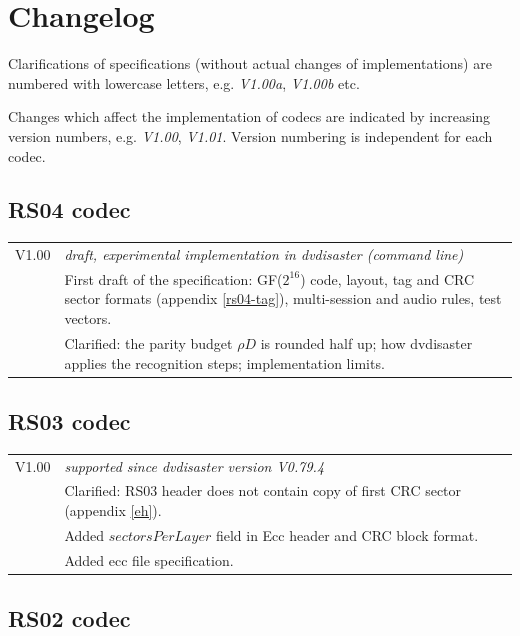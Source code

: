 \section{Changelog}

Clarifications of specifications (without actual changes of implementations) 
are numbered with lowercase letters, e.g. {\em V1.00a}, {\em V1.00b} etc.

\smallskip

Changes which affect the implementation of codecs are indicated by increasing
version numbers, e.g. {\em V1.00}, {\em V1.01}. Version numbering is independent
for each codec.

\subsection{RS04 codec}

\begin{tabular}{lp{14cm}}
V1.00 & {\em draft, experimental implementation in dvdisaster (command line)} \\
      & First draft of the specification: GF($2^{16}$) code, layout, tag and
        CRC sector formats (appendix \ref{rs04-tag}), multi-session and audio
        rules, test vectors. \\
      & Clarified: the parity budget $\rho D$ is rounded half up; how
        dvdisaster applies the recognition steps; implementation limits. \\
\end{tabular}

\subsection{RS03 codec}

\begin{tabular}{lp{14cm}}
V1.00 & {\em supported since dvdisaster version V0.79.4} \\
      & Clarified: RS03 header does not contain copy of first CRC sector (appendix \ref{eh}). \\
      & Added $sectorsPerLayer$ field in Ecc header and CRC block format.\\
      & Added ecc file specification.\\
\end{tabular}

\subsection{RS02 codec}

